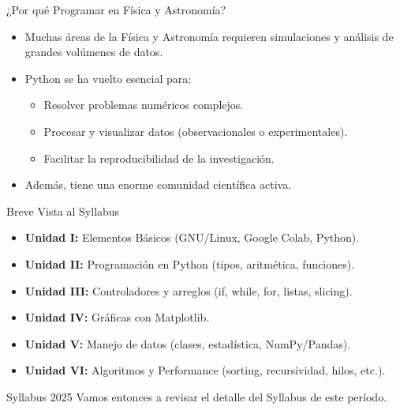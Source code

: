 \documentclass[10pt]{beamer}
\begin{document}
\begin{frame}{¿Por qué Programar en Física y Astronomía?}
  \begin{itemize}
    \item Muchas áreas de la Física y Astronomía requieren simulaciones y análisis de grandes volúmenes de datos.
    \item Python se ha vuelto esencial para:
      \begin{itemize}
        \item Resolver problemas numéricos complejos.
        \item Procesar y visualizar datos (observacionales o experimentales).
        \item Facilitar la reproducibilidad de la investigación.
      \end{itemize}
    \item Además, tiene una enorme comunidad científica activa.
  \end{itemize}
\end{frame}

\begin{frame}{Breve Vista al Syllabus}
  \begin{itemize}
    \item \textbf{Unidad I:} Elementos Básicos (GNU/Linux, Google Colab, Python).
    \item \textbf{Unidad II:} Programación en Python (tipos, aritmética, funciones).
    \item \textbf{Unidad III:} Controladores y arreglos (if, while, for, listas, slicing).
    \item \textbf{Unidad IV:} Gráficas con Matplotlib.
    \item \textbf{Unidad V:} Manejo de datos (clases, estadística, NumPy/Pandas).
    \item \textbf{Unidad VI:} Algoritmos y Performance (sorting, recursividad, hilos, etc.).
  \end{itemize}

\begin{block}{Syllabus 2025}
Vamos entonces a revisar el detalle del Syllabus de este período.
\end{block}
\end{frame}
\end{document}
